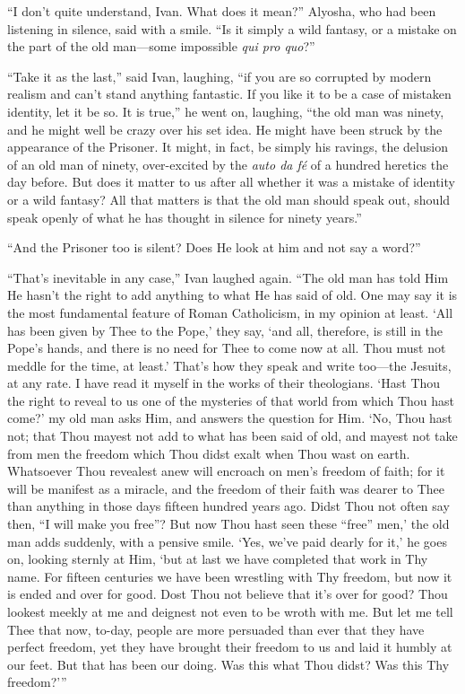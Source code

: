 ``I don't quite understand, Ivan. What does it mean?'' Alyosha, who
had been listening in silence, said with a smile. ``Is it simply a
wild fantasy, or a mistake on the part of the old man---some
impossible \textit{qui pro quo}?''

``Take it as the last,'' said Ivan, laughing, ``if you are so
corrupted by modern realism and can't stand anything fantastic. If you
like it to be a case of mistaken identity, let it be so. It is true,''
he went on, laughing, ``the old man was ninety, and  he
might well be crazy over his set idea. He might have been struck by
the appearance of the Prisoner. It might, in fact, be simply his
ravings, the delusion of an old man of ninety, over-excited by the
\textit{auto da f\'e} of a hundred heretics the day before. But does
it matter to us after all whether it was a mistake of identity or a
wild fantasy? All that matters is that the old man should speak out,
should speak openly of what he has thought in silence for ninety
years.''

``And the Prisoner too is silent? Does He look at him and not say a
word?''

``That's inevitable in any case,'' Ivan laughed again. ``The old man
has told Him He hasn't the right to add anything to what He has said
of old. One may say it is the most fundamental feature of Roman
Catholicism, in my opinion at least. `All has been given by Thee to
the Pope,' they say, `and all, therefore, is still in the Pope's
hands, and there is no need for Thee to come now at all. Thou must not
meddle for the time, at least.' That's how they speak and write
too---the Jesuits, at any rate. I have read it myself in the works of
their theologians. `Hast Thou the right to reveal to us one of the
mysteries of that world from which Thou hast come?' my old man asks
Him, and answers the question for Him. `No, Thou hast not; that Thou
mayest not add to what has been said of old, and mayest not take from
men the freedom which Thou didst exalt when Thou wast on earth.
Whatsoever Thou revealest anew will encroach on men's freedom of
faith; for it will be manifest as a miracle, and the freedom of their
faith was dearer to Thee than anything in those days fifteen hundred
years ago. Didst Thou not often say then, ``I will make you free''?
But now Thou hast seen these ``free'' men,' the old man adds suddenly,
with a pensive smile. `Yes, we've paid dearly for it,' he goes on,
looking sternly at Him, `but at last we have completed that work in
Thy name. For fifteen centuries we have been wrestling with Thy
freedom, but now it is ended and over for good. Dost Thou not believe
that it's over for good? Thou lookest meekly at me and deignest not
even to be wroth with me. But let me tell Thee that now, to-day,
people are more persuaded than ever that they have perfect freedom,
yet they have brought their freedom to us and laid it humbly at our
feet. But that has been our doing. Was this what Thou didst? Was this
Thy freedom?'''

